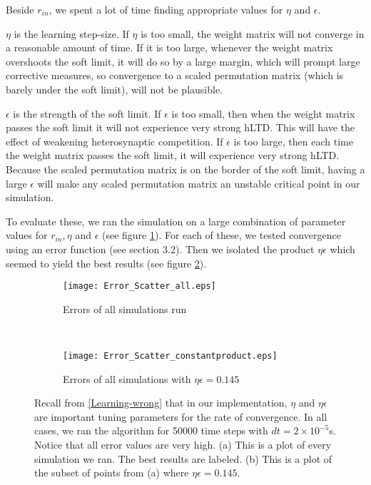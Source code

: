 Beside \(r_{in}\), we spent a lot of time finding appropriate values for \(\eta\) and \(\epsilon\). 

\(\eta\) is the learning step-size. If \(\eta\) is too small, the weight matrix will not converge in a reasonable amount of time. If it is too large, whenever the weight matrix overshoots the soft limit, it will do so by a large margin, which will prompt large corrective measures, so convergence to a scaled permutation matrix (which is barely under the soft limit), will not be plausible.
 
\(\epsilon\) is the strength of the soft limit. If \(\epsilon\) is too small, then when the weight matrix passes the soft limit it will not experience very strong hLTD. This will have the effect of weakening heterosynaptic competition. If \(\epsilon\) is too large, then each time the weight matrix passes the soft limit, it will experience very strong hLTD. Because the scaled permutation matrix is on the border of the soft limit, having a large \(\epsilon\) will make any scaled permutation matrix an unstable critical point in our simulation.

To evaluate these, we ran the simulation on a large combination of parameter values for \(r_{in}, \eta\) and \(\epsilon\) (see figure \ref{Error_scatter: all}). For each of these, we tested convergence using an error function (see section 3.2). Then we isolated the product \(\eta\epsilon\) which seemed to yield the best results (see figure \ref{Error_scatter: constant product}).

\begin{figure}[H]
\centering
\begin{subfigure}[b]{0.49\textwidth}
\texttt{[image: Error\_Scatter\_all.eps]}
\caption{Errors of all simulations run}
\label{Error_scatter: all}
\end{subfigure}
\,
\begin{subfigure}[b]{0.49\textwidth}
\texttt{[image: Error\_Scatter\_constantproduct.eps]}
\caption{Errors of all simulations with \(\eta\epsilon = 0.145\)}
\label{Error_scatter: constant product}
\end{subfigure}
\label{Error_scatter}
\caption{Recall from \eqref{Learning-wrong} that in our implementation, \(\eta\) and \(\eta\epsilon\) are important tuning parameters for the rate of convergence. In all cases, we ran the algorithm for 50000 time steps with \(dt = 2\times 10^{-5}\)s. Notice that all error values are very high. (a) This is a plot of every simulation we ran. The best results are labeled. (b) This is a  plot of the subset of points from (a) where \(\eta\epsilon = 0.145\).}
\end{figure}

